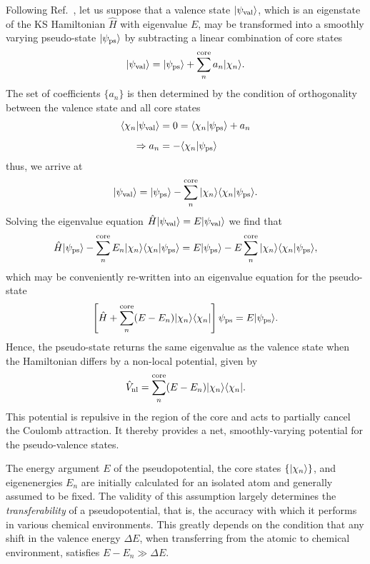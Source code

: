 Following Ref.~\cite{PhysRev.57.1169}, 
let us suppose that a valence state $\vert\psi_\textrm{val}\rangle$, 
which is an eigenstate of the KS Hamiltonian 
$\hat{H}$ with eigenvalue $E$, 
may be transformed into a smoothly varying pseudo-state 
$\vert\psi_\textrm{ps}\rangle$ 
by subtracting a linear combination of core states 
%
\begin{equation}
\vert\psi_\textrm{val}\rangle=\vert\psi_\textrm{ps}\rangle + \sum_n^\textrm{core} a_n \vert\chi_n\rangle.
\end{equation}
%
The set of coefficients $\{a_n\}$ 
is then determined by the condition of orthogonality 
between the valence state and all core states
%
\begin{align}
\langle\chi_n\vert\psi_\textrm{val}\rangle&=0=\langle\chi_n\vert\psi_\textrm{ps}\rangle+a_n\\[0.5em]
\Rightarrow a_n&=-\langle\chi_n\vert\psi_\textrm{ps}\rangle
\end{align}
thus, we arrive at 
\begin{equation}
\vert\psi_\textrm{val}\rangle=\vert\psi_\textrm{ps}\rangle - \sum_n^\textrm{core}\vert\chi_n\rangle \langle\chi_n\vert\psi_\textrm{ps}\rangle.
\end{equation}
%
Solving the eigenvalue equation 
$\hat{H}\vert\psi_\textrm{val}\rangle=E\vert\psi_\textrm{val}\rangle$ 
we find that 
%
\begin{equation}
\hat{H}\vert\psi_\textrm{ps}\rangle - \sum_n^\textrm{core}E_n \vert\chi_n\rangle \langle\chi_n\vert\psi_\textrm{ps}\rangle 
=E\vert\psi_\textrm{ps}\rangle 
- E\sum_n^\textrm{core} \vert\chi_n\rangle \langle\chi_n\vert\psi_\textrm{ps}\rangle, 
\end{equation}
%
which may be conveniently re-written 
into an eigenvalue equation for the pseudo-state
%
\begin{equation}
\left[\hat{H}+ \sum_n^\textrm{core}(E-E_n) \vert\chi_n\rangle \langle\chi_n\vert\right]{\psi_\textrm{ps}} 
=E\vert\psi_\textrm{ps}\rangle. 
\end{equation}
%
Hence, the pseudo-state returns 
the same eigenvalue as the valence state 
when the Hamiltonian differs by a non-local potential, 
given by
%
\begin{equation}
\hat{V}_\textrm{nl}= \sum_n^\textrm{core}(E-E_n) \vert\chi_n\rangle \langle\chi_n\vert.
\end{equation}
%
{This potential is repulsive in the region of the core 
and acts to partially cancel the Coulomb attraction.
%
It thereby provides a net, smoothly-varying potential 
for the pseudo-valence states.}

The energy argument $E$ of the pseudopotential, 
the core states $\{\vert\chi_n\rangle\}$, and eigenenergies $E_n$ 
are initially calculated for an isolated atom and 
generally assumed to be fixed.
%
The validity of this assumption 
largely determines 
the {\it transferability} of a pseudopotential, 
that is, the accuracy with which it performs in various 
chemical environments.
%
This greatly depends on the condition 
that any shift in the valence energy $\Delta E$, 
when transferring from the atomic to chemical environment, 
satisfies $E-E_n\gg \Delta E$.

